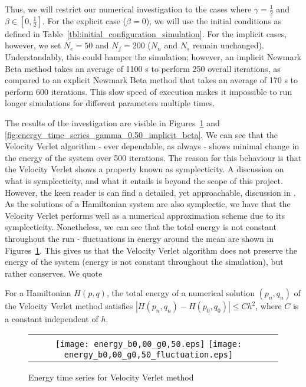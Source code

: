\documentclass[../Main.tex]{subfiles}
\begin{document}
Thus, we will restrict our numerical investigation to the cases where $\gamma = \frac{1}{2}$ and $\beta \in \left[0, \frac{1}{2}\right]$.
For the explicit case ($\beta = 0$), we will use the initial conditions as defined in Table~\ref{tbl:initial_configuration_simulation}. For the implicit cases, however, we set $N_{e} = 50$ and $N_{f} = 200$ ($N_{n}$ and $N_{s}$ remain unchanged). Understandably, this could hamper the simulation; however, an implicit Newmark Beta method takes an average of 1100 s to perform 250 overall iterations, as compared to an explicit Newmark Beta method that takes an average of 170 s to perform 600 iterations. This slow speed of execution makes it impossible to run longer simulations for different parameters multiple times.

The results of the investigation are visible in Figures~\ref{fig:energy_time_series_velocity_verlet} and \ref{fig:energy_time_series_gamma_0,50_implicit_beta}. We can see that the Velocity Verlet algorithm - ever dependable, as always - shows minimal change in the energy of the system over 500 iterations. The reason for this behaviour is that the Velocity Verlet shows a property known as symplecticity. A discussion on what is symplecticity, and what it entails is beyond the scope of this project. However, the keen reader is can find a detailed, yet approachable, discussion in \cite{Sanz-serna1992}. As the solutions of a Hamiltonian system are also symplectic, we have that the Velocity Verlet performs well as a numerical approximation scheme due to its symplecticity. Nonetheless, we can see that the total energy is not constant throughout the run - fluctuations in energy around the mean are shown in  Figures~\ref{fig:energy_time_series_velocity_verlet}. This gives us that the Velocity Verlet algorithm does not preserve the energy of the system (energy is not constant throughout the simulation), but rather conserves. We quote \cite{Harier2006}
\begin{theorem}
For a Hamiltonian $H(p, q)$, the total energy of a numerical solution $\left(p_{n}, q_{n}\right)$ of the Velocity Verlet method satisfies 
$\left|H\left(p_{n}, q_{n}\right) - H\left(p_{0}, q_{0}\right) \right| \leq Ch^{2}$, where $C$ is a constant independent of $h$.
\end{theorem}

\begin{figure}[H]
\centering
 	\begin{tabular}{@{}cc@{}}
		\texttt{[image: energy\_b0,00\_g0,50.eps]}
		\texttt{[image: energy\_b0,00\_g0,50\_fluctuation.eps]}
	\end{tabular}
	\caption{Energy time series for Velocity Verlet method}
	\label{fig:energy_time_series_velocity_verlet}
\end{figure}
\end{document}
